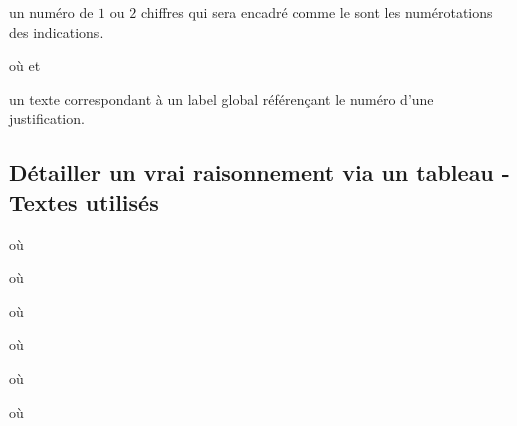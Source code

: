 \documentclass[12pt,a4paper]{article}
\begin{document}
\IDarg{} un numéro de $1$ ou $2$ chiffres qui sera encadré comme le sont les numérotations des indications.


\separation


  où \quad {}
                              et 

\IDarg{} un texte correspondant à un label global référençant le numéro d'une justification.


\subsection{Détailler un \og vrai \fg{} raisonnement via un tableau - Textes utilisés}

     où \quad {}


   où \quad {}

   où \quad {}

\extraspace

   où \quad {} 

    où \quad {}

    où \quad {}

\extraspace

\end{document}
